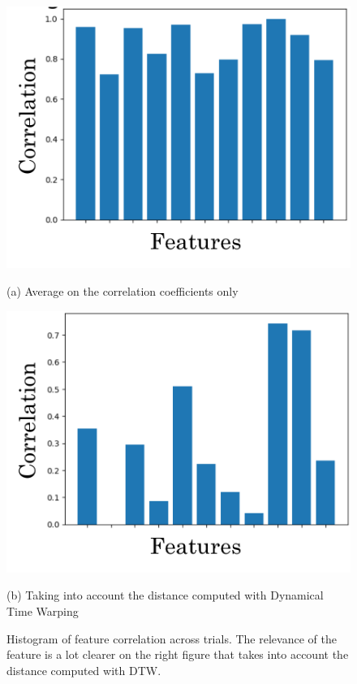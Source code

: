 \documentclass[a4paper, 10pt, conference]{ieeeconf}
\begin{document}
\begin{figure}[t]
  \centering

  \begin{minipage}[t]{0.49\linewidth}
    \centering
    \includegraphics[width=0.95\linewidth]{img/hist_raw.pdf}
    \caption*{(a) Average on the correlation coefficients only}
  \end{minipage}
  \hfill
  \begin{minipage}[t]{0.49\linewidth}
    \centering
    \includegraphics[width=0.95\linewidth]{img/hist_dtw.pdf}
    \caption*{(b) Taking into account the  distance computed with Dynamical Time Warping}
  \end{minipage}

\caption{Histogram of feature correlation across trials. The relevance of the feature is a lot clearer on the right figure that takes into account the distance computed with DTW.}
  \label{fig:histcorr}
\end{figure}
\end{document}
